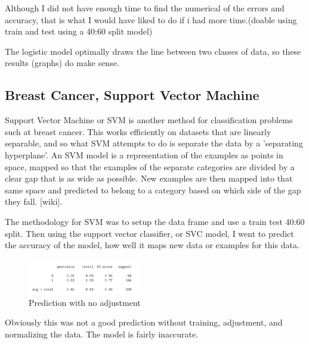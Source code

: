 \documentclass[conference]{IEEEtran}
\begin{document}
Although I did not have enough time to find the numerical of the errors and accuracy, that is what I would have liked to do if i had more time.(doable using train  and test using a 40:60 split model)

The logistic model optimally draws the line between two classes of data, so these results (graphs) do make sense.


\subsection{Breast Cancer, Support Vector Machine}
Support Vector Machine or SVM is another method for classification problems such at breast cancer. This works efficiently on datasets that are linearly separable, and so what SVM attempts to do is separate the data by a 'separating hyperplane'.  An SVM model is a representation of the examples as points in space, mapped so that the examples of the separate categories are divided by a clear gap that is as wide as possible. New examples are then mapped into that same space and predicted to belong to a category based on which side of the gap they fall. [wiki].

The methodology for SVM was to setup the data frame and use a train test 40:60 split. Then using the support vector classifier, or SVC model, I went to predict the accuracy of the model, how well it maps new data or examples for this data. 


\begin{figure}[htbp]
\centerline{\includegraphics[width=50mm,scale=0.5]{imgs/class1}}
\caption{Prediction with no adjustment}
\label{fig}
\end{figure}
Obviously this was not a good prediction without training, adjustment, and normalizing the data. The model is fairly inaccurate. 
\end{document}
